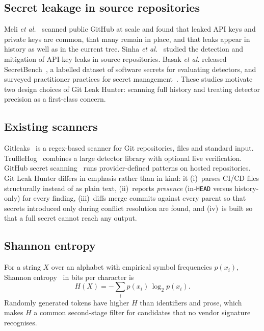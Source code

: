 \documentclass[conference]{IEEEtran}
\newcommand{\tool}{Git Leak Hunter}
\newcommand{\code}[1]{\texttt{#1}}
\begin{document}
\subsection{Secret leakage in source repositories}
Meli \emph{et al.}~\cite{meli2019} scanned public GitHub at scale and found that leaked API keys and
private keys are common, that many remain in place, and that leaks appear in history as well as in
the current tree. Sinha \emph{et al.}~\cite{sinha2015} studied the detection and mitigation of
API-key leaks in source repositories. Basak \emph{et al.} released SecretBench~\cite{secretbench},
a labelled dataset of software secrets for evaluating detectors, and surveyed practitioner
practices for secret management~\cite{basak2022}. These studies motivate two design choices of
\tool{}: scanning full history and treating detector precision as a first-class concern.

\subsection{Existing scanners}
Gitleaks~\cite{gitleaks} is a regex-based scanner for Git repositories, files and standard input.
TruffleHog~\cite{trufflehog} combines a large detector library with optional live verification.
GitHub secret scanning~\cite{ghsecretscanning} runs provider-defined patterns on hosted
repositories. \tool{} differs in emphasis rather than in kind: it (i)~parses CI/CD files
structurally instead of as plain text, (ii)~reports \emph{presence} (in-\code{HEAD} versus
history-only) for every finding, (iii)~diffs merge commits against every parent so that secrets
introduced only during conflict resolution are found, and (iv)~is built so that a full secret
cannot reach any output.

\subsection{Shannon entropy}
For a string $X$ over an alphabet with empirical symbol frequencies $p(x_i)$, Shannon
entropy~\cite{shannon1948} in bits per character is
\begin{equation}
H(X) = -\sum_i p(x_i)\,\log_2 p(x_i).
\label{eq:entropy}
\end{equation}
Randomly generated tokens have higher $H$ than identifiers and prose, which makes $H$ a common
second-stage filter for candidates that no vendor signature recognises.

\end{document}
